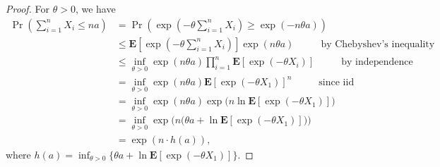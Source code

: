\documentclass[11pt]{article}
\begin{document}
\begin{proof}
For $\theta>0$, we have
$$\begin{aligned}
\Pr\left(\sum_{i=1}^n X_i \leq na\right) &= \Pr\left( \exp\left(-\theta \sum_{i=1}^n X_i\right) \geq \exp(-n\theta a)\right) \\
	&\leq \mathbf{E}\left[ \exp\left( -\theta \sum_{i=1}^n X_i \right)\right] \exp(n\theta a) \hspace{1cm} \text{ by Chebyshev's inequality} \\
	&\leq \inf_{\theta>0} \exp(n\theta a) \prod_{i=1}^n \mathbf{E} [\exp(-\theta X_i)] \hspace{1cm} \text{ by independence}\\
	&= \inf_{\theta >0} \exp(n\theta a) \mathbf{E}[\exp(-\theta X_1)]^n \hspace{1cm} \text{ since iid} \\
	&= \inf_{\theta >0} \exp(n\theta a) \exp\Big(n \ln \mathbf{E}[\exp(-\theta X_1)]\Big) \\
	&= \inf_{\theta >0} \exp\Big(n\big(\theta a + \ln \mathbf{E}[\exp(-\theta X_1)]\big)\Big) \\
	&= \exp(n \cdot h(a)),
\end{aligned}$$
where $h(a) = \inf_{\theta>0} \{ \theta a + \ln \mathbf{E}[\exp(-\theta X_1)]\}$.
\end{proof}
\end{document}

